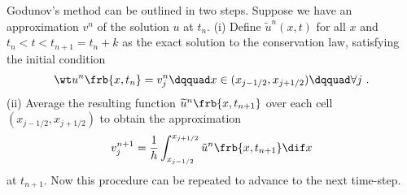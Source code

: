 \documentclass{article}
\begin{document}





\begin{exerciseList}


\item

Godunov's method can be outlined in two steps.
Suppose we have an approximation $v^n$ of the solution $u$ at $t_n$.
(i) Define $\widetilde{u}^{n}(x,t)$ for all $x$ and $t_n<t<t_{n+1}=t_n+k$ as the exact solution to the conservation law, satisfying the initial condition
\begin{gather} \label{GodIn}
	\wt u^n\frb{x,t_n}=v^n_j
	\dqquad
	x\in(x_{j-1/2},x_{j+1/2})
	\dqquad\forall j\ .
\end{gather}
(ii) Average the resulting function $\widetilde{u}^{n}\frb{x,t_{n+1}}$ over each cell $(x_{j-1/2},x_{j+1/2})$ to obtain the approximation
\begin{gather} \label{GogAvg}
	v_{j}^{n+1}=\frac{1}{h}\int_{x_{j-1/2}}^{x_{j+1/2}}\tilde{u}^{n}\frb{x,t_{n+1}}\dif x
\end{gather}
at $t_{n+1}$.
Now this procedure can be repeated to advance to the next time-step.


\end{exerciseList}
\end{document}
